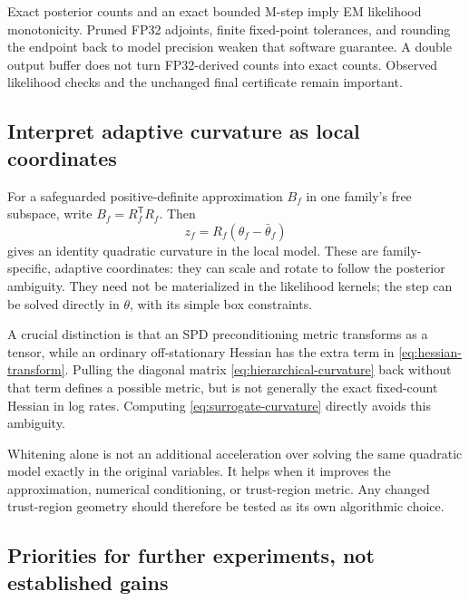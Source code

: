 \documentclass[11pt]{article}
\newcommand{\tr}{\mathsf T}
\begin{document}
Exact posterior counts and an exact bounded M-step imply EM likelihood
monotonicity. Pruned FP32 adjoints, finite fixed-point tolerances, and rounding
the endpoint back to model precision weaken that software guarantee. A double
output buffer does not turn FP32-derived counts into exact counts. Observed
likelihood checks and the unchanged final certificate remain important.

\subsection{Interpret adaptive curvature as local coordinates}

For a safeguarded positive-definite approximation $B_f$ in one family's free
subspace, write $B_f=R_f^\tr R_f$. Then
\begin{equation}
 z_f=R_f(\theta_f-\bar\theta_f)
 \label{eq:whitening}
\end{equation}
gives an identity quadratic curvature in the local model. These are
family-specific, adaptive coordinates: they can scale and rotate to follow the
posterior ambiguity. They need not be materialized in the likelihood kernels;
the step can be solved directly in $\theta$, with its simple box constraints.

A crucial distinction is that an SPD preconditioning metric transforms as a
tensor, while an ordinary off-stationary Hessian has the extra term in
\eqref{eq:hessian-transform}. Pulling the diagonal matrix
\eqref{eq:hierarchical-curvature} back without that term defines a possible
metric, but is not generally the exact fixed-count Hessian in log rates.
Computing \eqref{eq:surrogate-curvature} directly avoids this ambiguity.

Whitening alone is not an additional acceleration over solving the same
quadratic model exactly in the original variables. It helps when it improves
the approximation, numerical conditioning, or trust-region metric. Any changed
trust-region geometry should therefore be tested as its own algorithmic choice.

\subsection{Priorities for further experiments, not established gains}
\end{document}
